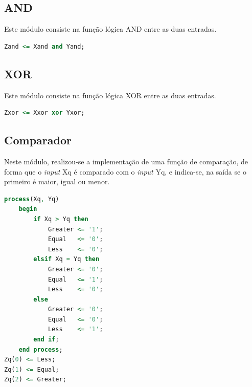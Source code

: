 \documentclass[a4paper, 12pt]{article}
\begin{document}
\subsection{AND}
Este módulo consiste na função lógica AND entre as duas entradas.
\begin{lstlisting}[language=VHDL]
Zand <= Xand and Yand;
\end{lstlisting}

\subsection{XOR}
Este módulo consiste na função lógica XOR entre as duas entradas.
\begin{lstlisting}[language=VHDL]
Zxor <= Xxor xor Yxor;
\end{lstlisting}

\subsection{Comparador}
Neste módulo, realizou-se a implementação de uma função de comparação, de forma que o \textit{input} Xq é comparado com o \textit{input} Yq, e indica-se, na saída se o primeiro é maior, igual ou menor.

\begin{lstlisting}[language=VHDL]
process(Xq, Yq)
    begin
        if Xq > Yq then
            Greater <= '1';
            Equal   <= '0';
            Less    <= '0';
        elsif Xq = Yq then
            Greater <= '0';
            Equal   <= '1';
            Less    <= '0';
        else
            Greater <= '0';
            Equal   <= '0';
            Less    <= '1';
        end if;
    end process;
Zq(0) <= Less;
Zq(1) <= Equal;
Zq(2) <= Greater;
\end{lstlisting}
\end{document}
